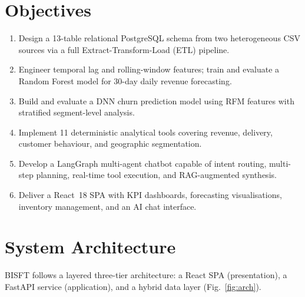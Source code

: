 \documentclass[conference]{IEEEtran}
\begin{document}
\section{Objectives}
\begin{enumerate}[leftmargin=*,noitemsep,topsep=2pt]
  \item Design a 13-table relational PostgreSQL schema from two heterogeneous CSV sources
        via a full Extract-Transform-Load (ETL) pipeline.
  \item Engineer temporal lag and rolling-window features; train and evaluate a Random
        Forest model for 30-day daily revenue forecasting.
  \item Build and evaluate a DNN churn prediction model using RFM features with
        stratified segment-level analysis.
  \item Implement 11 deterministic analytical tools covering revenue, delivery,
        customer behaviour, and geographic segmentation.
  \item Develop a LangGraph multi-agent chatbot capable of intent routing, multi-step
        planning, real-time tool execution, and RAG-augmented synthesis.
  \item Deliver a React~18 SPA with KPI dashboards, forecasting visualisations,
        inventory management, and an AI chat interface.
\end{enumerate}

\section{System Architecture}

BISFT follows a layered three-tier architecture: a React SPA (presentation), a FastAPI
service (application), and a hybrid data layer (Fig.~\ref{fig:arch}).
\end{document}
